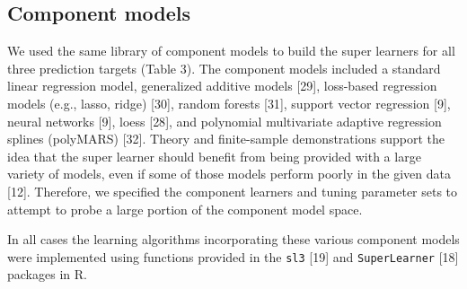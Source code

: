 \documentclass[10pt,letterpaper]{article}
\begin{document}
\hypertarget{component-models}{%
\subsection{Component models}\label{component-models}}

We used the same library of component models to build the super learners
for all three prediction targets (Table 3). The component models
included a standard linear regression model, generalized additive models
{[}29{]}, loss-based regression models (e.g., lasso, ridge) {[}30{]},
random forests {[}31{]}, support vector regression {[}9{]}, neural
networks {[}9{]}, loess {[}28{]}, and polynomial multivariate adaptive
regression splines (polyMARS) {[}32{]}. Theory and finite-sample
demonstrations support the idea that the super learner should benefit
from being provided with a large variety of models, even if some of
those models perform poorly in the given data {[}12{]}. Therefore, we
specified the component learners and tuning parameter sets to attempt to
probe a large portion of the component model space.

In all cases the learning algorithms incorporating these various
component models were implemented using functions provided in the
\texttt{sl3} {[}19{]} and \texttt{SuperLearner} {[}18{]} packages in R.
\end{document}
